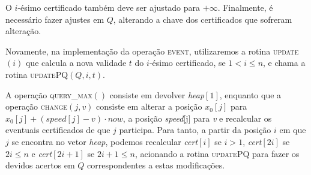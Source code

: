 

O $i$-ésimo certificado também deve ser ajustado para $+\infty$.
Finalmente, é necessário fazer ajustes em $Q$, alterando a chave dos
certificados que sofreram alteração.





Novamente, na implementação da operação \textsc{event}, utilizaremos
a rotina \textsc{update}$(i)$ que calcula a nova validade $t$ do
$i$-ésimo certificado, se $1 < i \leq n$, e chama a rotina
\textsc{updatePQ}$(Q, i, t)$.







A operação \textsc{query\_max}$()$ consiste em devolver
\textit{heap}$[1]$, enquanto que a operação \textsc{change}$(j, v)$
consiste em alterar a posição $x_0[j]$ para $x_0[j] +
(\mathit{speed}[j] - v)\cdot now$, a posição \textit{speed}[j] para
\textit{v} e recalcular os eventuais certificados de que $j$
participa. Para tanto, a partir da posição $i$ em que $j$ se
encontra no vetor \textit{heap}, podemos recalcular
\textit{cert}$[i]$ se $i > 1$, \textit{cert}$[2i]$ se $2i \leq n$ e
\textit{cert}$[2i + 1]$ se $2i + 1 \leq n$, acionando a rotina
\textsc{updatePQ} para fazer os devidos acertos em $Q$
correspondentes a estas modificações.
